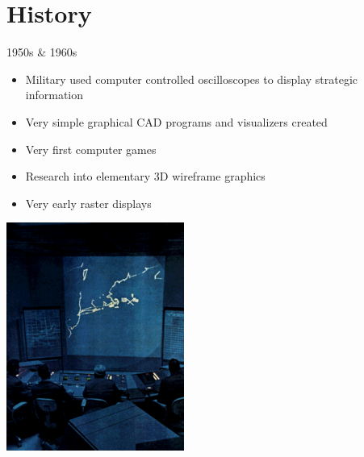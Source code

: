 \documentclass{lug}
\newcommand{\splitslide}[4]{
    \noindent
    \begin{minipage}{#1 \textwidth - #2 }
        #3
    \end{minipage}%
    \hspace{ \dimexpr #2 * 2 \relax }%
    \begin{minipage}{\textwidth - #1 \textwidth - #2 }
        #4
    \end{minipage}
}
\begin{document}
\section{History}

\begin{frame}{1950s \& 1960s}
    \splitslide{0.65}{.7em}{
        \small
        \begin{itemize}
            \item Military used computer controlled oscilloscopes to display strategic information
            \item Very simple graphical CAD programs and visualizers created
            \item Very first computer games
            \item Research into elementary 3D wireframe graphics
            \item Very early raster displays
        \end{itemize}
    }{
        \includegraphics[width=\textwidth]{graphics/sage_control} \\
}
\end{frame}
\end{document}

